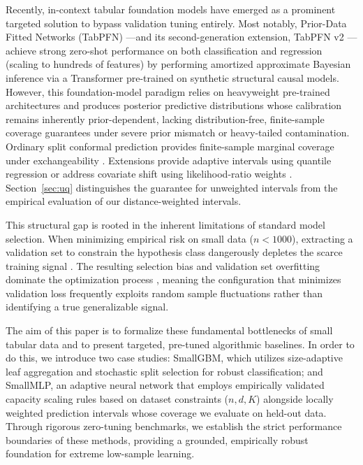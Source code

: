 \documentclass{article}
\begin{document}
Recently, in-context tabular foundation models have emerged as a prominent targeted solution to bypass validation tuning entirely. Most notably, Prior-Data Fitted Networks (TabPFN) \cite{hollmann2022tabpfn, muller2021transformers}—and its second-generation extension, TabPFN v2 \cite{hollmann2025tabpfn}—achieve strong zero-shot performance on both classification and regression (scaling to hundreds of features) by performing amortized approximate Bayesian inference via a Transformer pre-trained on synthetic structural causal models. However, this foundation-model paradigm relies on heavyweight pre-trained architectures and produces posterior predictive distributions whose calibration remains inherently prior-dependent, lacking distribution-free, finite-sample coverage guarantees under severe prior mismatch or heavy-tailed contamination. Ordinary split conformal prediction provides finite-sample marginal coverage under exchangeability \cite{vovk2005algorithmic, shafer2008tutorial}. Extensions provide adaptive intervals using quantile regression \cite{romano2019conformalized} or address covariate shift using likelihood-ratio weights \cite{tibshirani2019conformal}. Section~\ref{sec:uq} distinguishes the guarantee for unweighted intervals from the empirical evaluation of our distance-weighted intervals.

This structural gap is rooted in the inherent limitations of standard model selection. When minimizing empirical risk on small data ($n < 1000$), extracting a validation set to constrain the hypothesis class dangerously depletes the scarce training signal \cite{varoquaux2018cross, brain2002effect}. The resulting selection bias and validation set overfitting dominate the optimization process \cite{dwork2015reusable}, meaning the configuration that minimizes validation loss frequently exploits random sample fluctuations rather than identifying a true generalizable signal.

The aim of this paper is to formalize these fundamental bottlenecks of small tabular data and to present targeted, pre-tuned algorithmic baselines. In order to do this, we introduce two case studies: SmallGBM, which utilizes size-adaptive leaf aggregation and stochastic split selection for robust classification; and SmallMLP, an adaptive neural network that employs empirically validated capacity scaling rules based on dataset constraints ($n, d, K$) alongside locally weighted prediction intervals whose coverage we evaluate on held-out data. Through rigorous zero-tuning benchmarks, we establish the strict performance boundaries of these methods, providing a grounded, empirically robust foundation for extreme low-sample learning.
\end{document}
